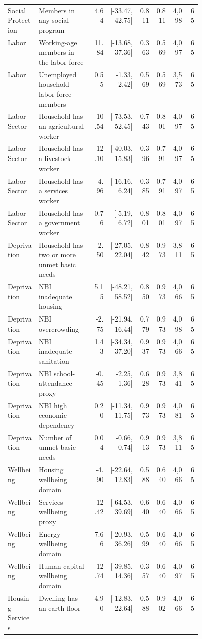 \begin{longtable}{p{0.16\linewidth}p{0.29\linewidth}rrrrrr}
Social Protection & Members in any social program & 4.64 & [-33.47, 42.75] & 0.811 & 0.811 & 4,098 & 65 \\
Labor & Working-age members in the labor force & 11.84 & [-13.68, 37.36] & 0.363 & 0.569 & 4,097 & 65 \\
Labor & Unemployed household labor-force members & 0.55 & [-1.33, 2.42] & 0.569 & 0.569 & 3,573 & 65 \\
Labor Sector & Household has an agricultural worker & -10.54 & [-73.53, 52.45] & 0.743 & 0.801 & 4,097 & 65 \\
Labor Sector & Household has a livestock worker & -12.10 & [-40.03, 15.83] & 0.396 & 0.791 & 4,097 & 65 \\
Labor Sector & Household has a services worker & -4.96 & [-16.16, 6.24] & 0.385 & 0.791 & 4,097 & 65 \\
Labor Sector & Household has a government worker & 0.76 & [-5.19, 6.72] & 0.801 & 0.801 & 4,097 & 65 \\
Deprivation & Household has two or more unmet basic needs & -2.50 & [-27.05, 22.04] & 0.842 & 0.973 & 3,811 & 65 \\
Deprivation & NBI inadequate housing & 5.15 & [-48.21, 58.52] & 0.850 & 0.973 & 4,066 & 65 \\
Deprivation & NBI overcrowding & -2.75 & [-21.94, 16.44] & 0.779 & 0.973 & 4,098 & 65 \\
Deprivation & NBI inadequate sanitation & 1.43 & [-34.34, 37.20] & 0.937 & 0.973 & 4,066 & 65 \\
Deprivation & NBI school-attendance proxy & -0.45 & [-2.25, 1.36] & 0.628 & 0.973 & 3,841 & 65 \\
Deprivation & NBI high economic dependency & 0.20 & [-11.34, 11.75] & 0.973 & 0.973 & 4,081 & 65 \\
Deprivation & Number of unmet basic needs & 0.04 & [-0.66, 0.74] & 0.913 & 0.973 & 3,811 & 65 \\
Wellbeing & Housing wellbeing domain & -4.90 & [-22.64, 12.83] & 0.588 & 0.640 & 4,066 & 65 \\
Wellbeing & Services wellbeing proxy & -12.42 & [-64.53, 39.69] & 0.640 & 0.640 & 4,066 & 65 \\
Wellbeing & Energy wellbeing domain & 7.66 & [-20.93, 36.26] & 0.599 & 0.640 & 4,066 & 65 \\
Wellbeing & Human-capital wellbeing domain & -12.74 & [-39.85, 14.36] & 0.357 & 0.640 & 4,097 & 65 \\
Housing Services & Dwelling has an earth floor & 4.90 & [-12.83, 22.64] & 0.588 & 0.902 & 4,066 & 65 \\

\end{longtable}
